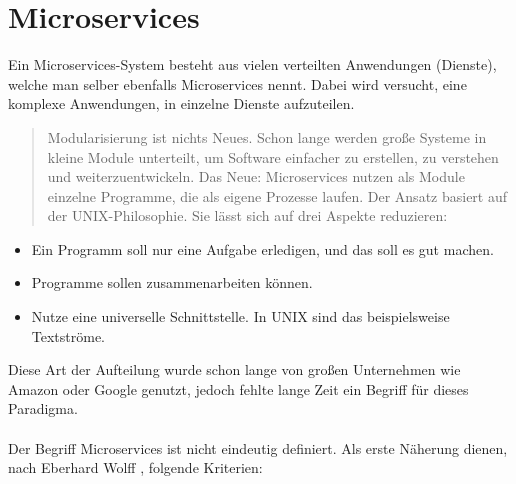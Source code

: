 \chapter{Microservices}
\label{chap:Microservices}
Ein Microservices-System besteht aus vielen verteilten Anwendungen (Dienste), welche man selber ebenfalls Microservices nennt. Dabei wird versucht, eine komplexe Anwendungen, in einzelne Dienste aufzuteilen.

\begin{quotation}
    \frqq Modularisierung ist nichts Neues. Schon lange werden große Systeme in kleine Module unterteilt, um Software einfacher zu erstellen, zu verstehen und weiterzuentwickeln. Das Neue: Microservices nutzen als Module einzelne Programme, die als eigene Prozesse laufen. Der Ansatz basiert auf der UNIX-Philosophie. Sie lässt sich auf drei Aspekte reduzieren:\flqq\cite[S. 2]{EWolff2016:Microservices}
\end{quotation}

\begin{itemize}
    \item Ein Programm soll nur eine Aufgabe erledigen, und das soll es gut machen.
    \item Programme sollen zusammenarbeiten können.
    \item Nutze eine universelle Schnittstelle. In UNIX sind das beispielsweise Textströme.
\end{itemize}
Diese Art der Aufteilung wurde schon lange von großen Unternehmen wie Amazon oder Google genutzt, jedoch fehlte lange Zeit ein Begriff für dieses Paradigma.
\\\\
Der Begriff Microservices ist nicht eindeutig definiert. Als erste Näherung dienen, nach Eberhard Wolff \cite[S. 2]{EWolff2016:Microservices}, folgende Kriterien:

